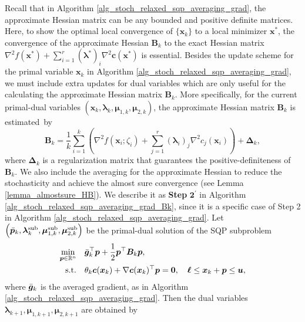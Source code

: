 \documentclass[aos]{imsart}
\numberwithin{equation}{section}
\theoremstyle{plain}
\begin{document}
Recall that in Algorithm \ref{alg_stoch_relaxed_sqp_averaging_grad}, the approximate Hessian matrix can be any bounded and positive definite matrices. Here, to show the optimal local convergence of $\{\bm{x}_k\}$ to a local minimizer $\bm{x}^{*}$, the convergence of the approximate Hessian $\bm{B}_k$ to the exact Hessian matrix $\nabla^2 f(\bm{x}^{*}) + \sum_{i=1}^{r} (\bm{\lambda}^{*})_{i} \nabla^2 \bm{c}(\bm{x}^{*})$ is essential. Besides the update scheme for the primal variable $\bm{x}_k$ in Algorithm \ref{alg_stoch_relaxed_sqp_averaging_grad}, we must include extra updates for dual variables which are only useful for the calculating the approximate Hessian matrix $\bm{B}_k$. More specifically, for the current primal-dual variables $\left(\bm{x}_k, \bm{\lambda}_k, \bm{\mu}_{1,k}, \bm{\mu}_{2,k} \right)$, the approximate Hessian matrix $\bm{B}_k$ is estimated~by 
\begin{equation*}
        \bm{B}_k = \frac{1}{k} \sum_{i=1}^{k} \left( \nabla^2 f(\bm{x}_i; \zeta_{i}) + \sum_{j=1}^{r} \left( \bm{\lambda}_{i}\right)_{j}\nabla^2 c_j(\bm{x}_{i})\right) + \bm{\Delta}_k,
\end{equation*}
 where $\bm{\Delta}_k$ is a regularization matrix that guarantees the positive-definiteness of $\bm{B}_k$. We also include the averaging for the approximate Hessian to reduce the stochasticity and achieve the almost sure convergence (see Lemma \ref{lemma_almostsure_HB}). 
We describe it as \textbf{Step} $\mathbf{2^{\prime}}$ in Algorithm \ref{alg_stoch_relaxed_sqp_averaging_grad_Bk}, since it is a specific case of Step 2 in Algorithm \ref{alg_stoch_relaxed_sqp_averaging_grad}. 
Let $\left(\Bar{\bm{p}}_k,  \bm{\lambda}_k^{\text{sub}}, \bm{\mu}_{1,k}^{\text{sub}}, \bm{\mu}_{2,k}^{\text{sub}} \right)$ be the primal-dual solution of the SQP subproblem 
 \begin{equation*}
    \begin{split}
        \min_{\bm{p} \in \mathbb{R}^{n}} & \hspace{1em} \Bar{\bm{g}}_{k}^{\top}\bm{p}+ \frac{1}{2}\bm{p}^{\top}\bm{B}_k\bm{p},\\
        \text{s.t.} & \hspace{1em} \theta_k \bm{c}(\bm{x}_k)+\nabla \bm{c}(\bm{x}_k)^{\top}\bm{p} = \bm{0},\quad \bm{\ell} \leq \bm{x}_k + \bm{p} \leq \bm{u},
    \end{split}    
\end{equation*} 
where $\Bar{\bm{g}}_{k}$ is the averaged gradient, as in Algorithm \ref{alg_stoch_relaxed_sqp_averaging_grad}. Then the dual variables $\bm{\lambda}_{k+1}, \bm{\mu}_{1,k+1}, \bm{\mu}_{2,k+1}$ are obtained by
\end{document}

